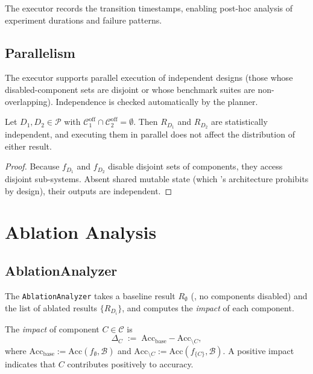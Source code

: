 \documentclass[11pt]{article}
\newcommand{\Acc}{\mathrm{Acc}}             %
\newcommand{\AccBase}{\Acc_{\mathrm{base}}} %
\newcommand{\AccAbl}[1]{\Acc_{\setminus #1}}%
\newcommand{\Impact}[1]{\Delta_{\!#1}}      %
\newcommand{\CompSet}{\mathcal{C}}          %
\begin{document}
The executor records the transition timestamps, enabling post-hoc
analysis of experiment durations and failure patterns.

\subsection{Parallelism}
\label{subsec:parallelism}

The executor supports parallel execution of independent designs
(those whose disabled-component sets are disjoint or whose benchmark
suites are non-overlapping).  Independence is checked automatically
by the planner.

\begin{proposition}
\label{prop:parallel}
Let $D_1, D_2 \in \mathcal{P}$ with
$\CompSet_1^{\mathrm{off}} \cap \CompSet_2^{\mathrm{off}} = \emptyset$.
Then $R_{D_1}$ and $R_{D_2}$ are statistically independent, and
executing them in parallel does not affect the distribution of either
result.
\end{proposition}

\begin{proof}
Because $f_{D_1}$ and $f_{D_2}$ disable disjoint sets of components,
they access disjoint sub-systems.  Absent shared mutable state (which
\JuGeo's architecture prohibits by design), their outputs are
independent.
\end{proof}

\section{Ablation Analysis}
\label{sec:analysis}

\subsection{AblationAnalyzer}
\label{subsec:analyzer}

The \texttt{AblationAnalyzer} takes a baseline result
$R_\emptyset$ (\ie, no components disabled) and the list of ablated
results $\{R_{D_i}\}$, and computes the \emph{impact} of each
component.

\begin{definition}
\label{def:impact}
The \emph{impact} of component $C \in \CompSet$ is
\[
  \Impact{C} \;:=\; \AccBase - \AccAbl{C},
\]
where $\AccBase := \Acc(f_\emptyset, \mathcal{B})$ and
$\AccAbl{C} := \Acc(f_{\{C\}}, \mathcal{B})$.  A positive impact
indicates that $C$ contributes positively to accuracy.
\end{definition}
\end{document}
